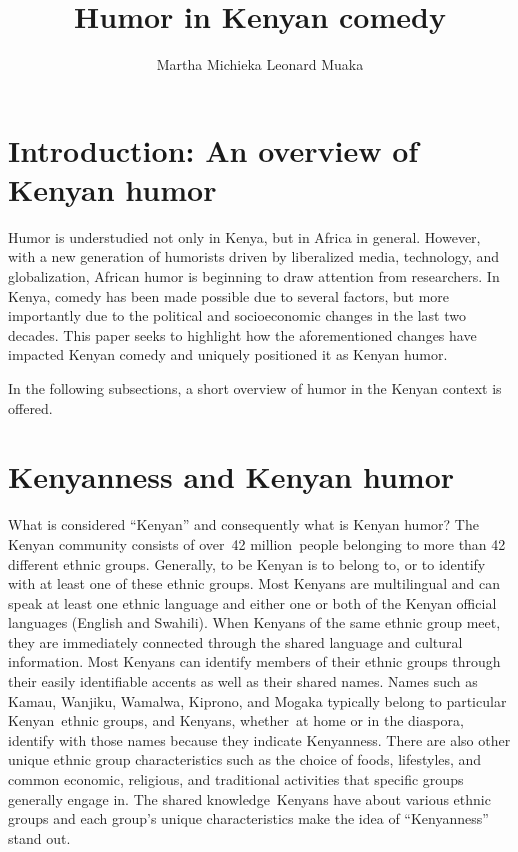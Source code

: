 \documentclass[output=paper]{langsci/langscibook}
\title{Humor in Kenyan comedy}
\author{%
 Martha Michieka   \affiliation{ East Tennessee State University}
 Leonard Muaka\affiliation{Winston Salem State University, North Carolina}\lastand 
}
\begin{document}
 

\section{Introduction: An overview of Kenyan humor}

Humor is understudied not only in Kenya, but in Africa in general. However, with a new generation of humorists driven by liberalized media, technology, and globalization, African humor is beginning to draw attention from researchers. In Kenya, comedy has been made possible due to several factors, but more importantly due to the political and socioeconomic changes in the last two decades. This paper seeks to highlight how the aforementioned changes have impacted Kenyan comedy and uniquely positioned it as Kenyan humor. 

In the following subsections, a short overview of humor in the Kenyan context is offered.\textbf{ \\
}

\section{Kenyanness and Kenyan humor}

What is considered “Kenyan” and consequently what is Kenyan humor? The Kenyan community consists of over~42 million~people belonging to more than 42 different ethnic groups. Generally, to be Kenyan is to belong to, or to identify with at least one of these ethnic groups. Most Kenyans are multilingual and can speak at least one ethnic language and either one or both of the Kenyan official languages (English and Swahili). When Kenyans of the same ethnic group meet, they are immediately connected through the shared language and cultural information. Most Kenyans can identify members of their ethnic groups through their easily identifiable accents as well as their shared names. Names such as Kamau, Wanjiku, Wamalwa, Kiprono, and Mogaka typically belong to particular Kenyan~ethnic groups, and Kenyans, whether~at home or in the diaspora, identify with those names because they indicate Kenyanness. There are also other unique ethnic group characteristics such as the choice of foods, lifestyles, and common economic, religious, and traditional activities that specific groups generally engage in. The shared knowledge~Kenyans have about various ethnic groups and each group’s unique characteristics make the idea of “Kenyanness” stand out.
\end{document}
